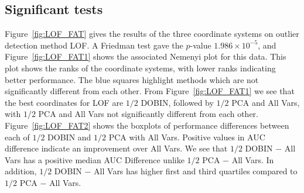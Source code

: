 \documentclass[a4paper,12pt]{article}
\begin{document}
\subsection{Significant tests}\label{sec:DatRepo1}


Figure~\ref{fig:LOF_FAT} gives the results of the three coordinate systems on outlier detection method LOF. A Friedman test gave the $p$-value $1.986 \times 10^{-5}$, and Figure~\ref{fig:LOF_FAT1} shows the associated Nemenyi plot for this data. This plot shows the ranks of the coordinate systems, with lower ranks indicating better performance. The blue squares highlight methods which are not significantly different from each other. From Figure~\ref{fig:LOF_FAT1} we see that the best coordinates for LOF are $1/2$ DOBIN, followed by $1/2$ PCA and All Vars, with $1/2$ PCA and All Vars not significantly different from each other.
Figure~\ref{fig:LOF_FAT2} shows the boxplots of performance differences between each of $1/2$ DOBIN and $1/2$ PCA with All Vars. %
Positive values in AUC difference indicate an improvement over All Vars. We see that $1/2$ DOBIN $-$ All Vars has a positive median AUC Difference unlike $1/2$ PCA $-$ All Vars. In addition, $1/2$ DOBIN $-$ All Vars has higher first and third quartiles compared to  $1/2$ PCA $-$ All Vars.
\end{document}
